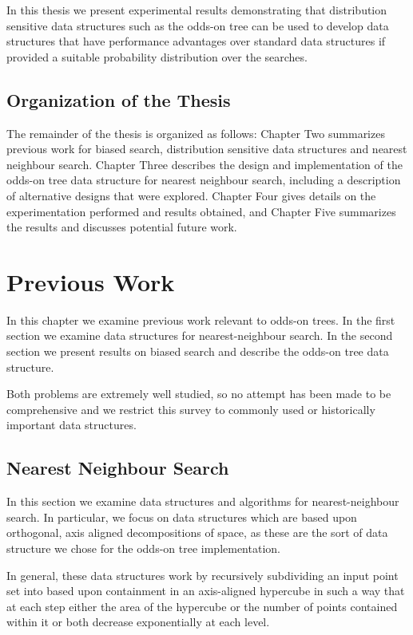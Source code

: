 \documentclass[mcs]{scsthesis}
\begin{document}
In this thesis we present experimental results demonstrating that distribution
sensitive data structures such as the odds-on tree can be used to develop
data structures that have performance advantages over standard data structures
if provided a suitable probability distribution over the searches.

\section{Organization of the Thesis}

The remainder of the thesis is organized as follows: Chapter Two summarizes
previous work for biased search, distribution sensitive data structures and
nearest neighbour search.  Chapter Three describes the design and implementation
of the odds-on tree data structure for nearest neighbour search, including a
description of alternative designs that were explored. Chapter Four gives
details on the experimentation performed and results obtained, and Chapter Five
summarizes the results and discusses potential future work.

\chapter{Previous Work}

In this chapter we examine previous work relevant to odds-on trees. In the first
section we examine data structures for nearest-neighbour search. In the second
section we present results on biased search and describe the odds-on tree data
structure.

Both problems are extremely well studied, so no attempt has been made to be
comprehensive and we restrict this survey to commonly used or historically
important data structures.

\section{Nearest Neighbour Search}

In this section we examine data structures and algorithms for nearest-neighbour
search. In particular, we focus on data structures which are based upon
orthogonal, axis aligned decompositions of space, as these are the sort of data
structure we chose for the odds-on tree implementation.

In general, these data structures work by recursively subdividing an input point
set into based upon containment in an axis-aligned hypercube in such a way that
at each step either the area of the hypercube or the number of points contained
within it or both decrease exponentially at each level.
\end{document}
